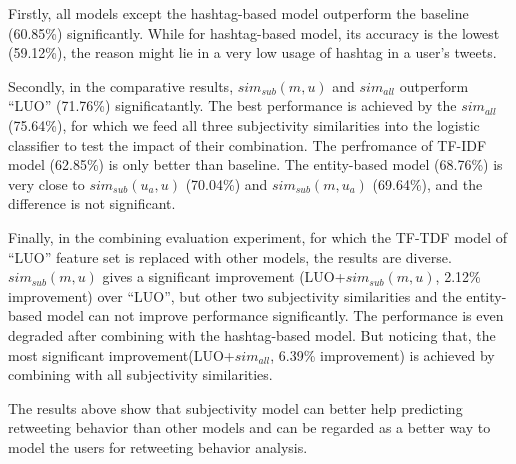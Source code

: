 \documentclass[letterpaper]{article}
\begin{document}
Firstly, all models except the hashtag-based model outperform the baseline (60.85\%) significantly. While for hashtag-based model, its accuracy is the lowest (59.12\%), the reason might lie in a very low usage of hashtag in a user's tweets. 

Secondly, in the comparative results, $ sim_{sub} \left( m,u \right) $ and $ sim_{all}  $ outperform ``LUO'' (71.76\%) significatantly.
The best performance is achieved by the $ sim_{all}  $ (75.64\%), for which we feed all three subjectivity similarities into the logistic classifier to test the impact of their combination. 
The perfromance of TF-IDF model (62.85\%) is only better than baseline. 
The entity-based model (68.76\%) is very close to  $ sim_{sub}\left( u_{a},u \right)$ (70.04\%) and $ sim_{sub}\left( m,u_{a} \right)  $ (69.64\%), and the difference is not significant.

Finally, in the combining evaluation experiment, for which the TF-TDF model of ``LUO'' feature set is replaced with other models, the results are diverse. $ sim_{sub} \left( m,u \right) $ gives a significant improvement (LUO+$ sim_{sub} \left( m,u \right) $, 2.12\% improvement) over ``LUO'', but other two subjectivity similarities and the entity-based model can not improve performance significantly. The performance is even degraded after combining with the hashtag-based model. 
But noticing that, the most significant improvement(LUO+$ sim_{all}  $, 6.39\% improvement) is achieved by combining with all subjectivity similarities. 

The results above show that subjectivity model can better help predicting retweeting behavior than other models and can be regarded as a better way to model the users for retweeting behavior analysis. 
\end{document}
